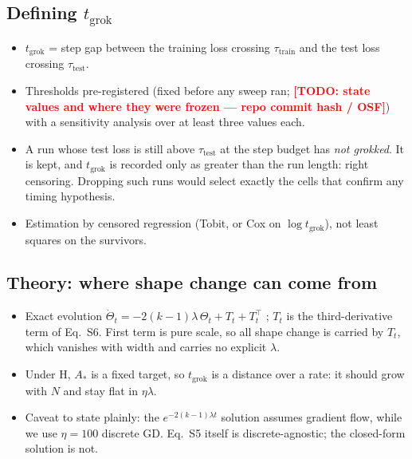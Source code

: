 \documentclass[a4paper,11pt]{article} %
\newcommand{\TODO}[1]{\textcolor{red}{\textbf{[TODO: #1]}}}
\newcommand{\tgrok}{t_{\mathrm{grok}}}
\newcommand{\Astar}{A_{*}}
\begin{document}
\subsection{Defining $\tgrok$}
\begin{itemize}
	\item $\tgrok$ = step gap between the training loss crossing
		$\tau_{\mathrm{train}}$ and the test loss crossing $\tau_{\mathrm{test}}$.
	\item Thresholds pre-registered (fixed before any sweep ran; \TODO{state
		values and where they were frozen --- repo commit hash / OSF}) with a
		sensitivity analysis over at least three values each.
	\item A run whose test loss is still above $\tau_{\mathrm{test}}$ at the step
		budget has \emph{not grokked}. It is kept, and $\tgrok$ is recorded only as
		greater than the run length: right censoring. Dropping such runs would select
		exactly the cells that confirm any timing hypothesis.
	\item Estimation by censored regression (Tobit, or Cox on $\log\tgrok$), not
		least squares on the survivors.
\end{itemize}

\subsection{Theory: where shape change can come from}
\begin{itemize}
	\item Exact evolution $\dot\Theta_t=-2(k-1)\lambda\,\Theta_t+T_t+T_t^\top$
		\citep[Eq.~S5]{lewkowycz2020l2}; $T_t$ is the third-derivative term of
		Eq.~S6. First term is pure scale, so all shape change is carried by $T_t$,
		which vanishes with width and carries no explicit $\lambda$.
	\item Under H, $\Astar$ is a fixed target, so $\tgrok$ is a distance over a
		rate: it should grow with $N$ and stay flat in $\eta\lambda$.
	\item Caveat to state plainly: the $e^{-2(k-1)\lambda t}$ solution assumes
		gradient flow, while we use $\eta=100$ discrete GD. Eq.~S5 itself is
		discrete-agnostic; the closed-form solution is not.
\end{itemize}
\end{document}
